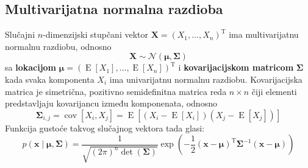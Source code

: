 \documentclass[times, utf8, zavrsni]{fer}
\begin{document}
\subsection{Multivarijatna normalna razdioba}
Slučajni $n$-dimenzijski stupčani vektor $\mathbf{X} = \left(X_1, \dots, X_n\right)^{\mathrm{T}}$ ima multivarijatnu normalnu razdiobu, odnosno
\[\mathbf{X} \sim \mathcal{N} \left(\boldsymbol{\mu}, \boldsymbol{\Sigma}\right)\]
sa \textbf{lokacijom}
$\boldsymbol{\mu} = \left(\operatorname{E}[X_1], \dots, \operatorname{E}[X_n]\right)^{\mathrm{T}}$ i \textbf{kovarijacijskom matricom} $\boldsymbol{\Sigma}$ kada svaka komponenta $X_i$ ima univarijatnu normalnu razdiobu. Kovarijacijska matrica je simetrična, pozitivno semidefinitna matrica reda $n \times n$ čiji elementi predstavljaju kovarijancu između komponenata, odnosno
\[\boldsymbol{\Sigma}_{i,j} = \operatorname{cov}
\left[X_i, X_j\right] 
= \operatorname{E}\left[ 
            \left(X_i - \operatorname{E}[X_i]\right)
            \left(X_j - \operatorname{E}[X_j]\right)
\right]
\]
Funkcija gustoće takvog slučajnog vektora tada glasi:
\begin{equation}
\label{gaussdensity}
p \left(\mathbf{x} \middle| \boldsymbol{\mu}, \boldsymbol{\Sigma}\right)
= \frac{1}{\sqrt{\left(2 \pi\right)^n \operatorname{det} \left(\boldsymbol{\Sigma}\right)}}
\exp{\left(
    -\frac{1}{2}
        \left(\mathbf{x} - \boldsymbol{\mu}\right)^{\mathrm{T}}
        \boldsymbol{\Sigma}^{-1}
        \left(\mathbf{x} - \boldsymbol{\mu}\right)
\right)}
\end{equation}
\end{document}
